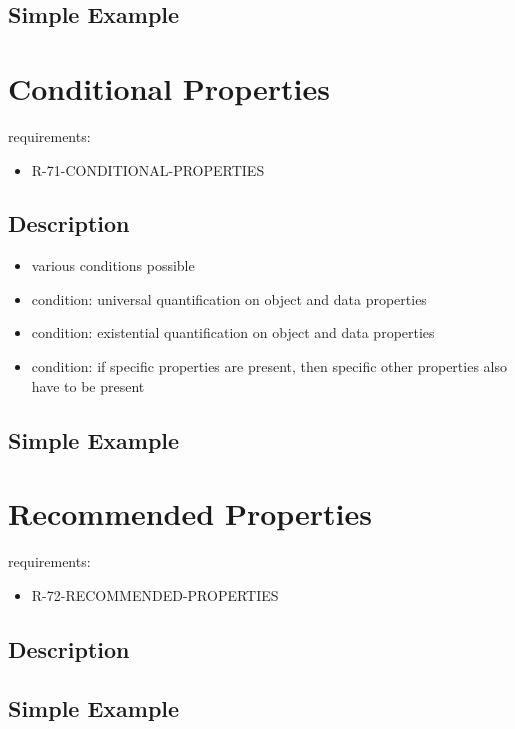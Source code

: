 \documentclass{llncs}
\begin{document}
\subsection{Simple Example}

\section{Conditional Properties}

requirements:

\begin{itemize}
	\item R-71-CONDITIONAL-PROPERTIES
\end{itemize}

\subsection{Description}

\begin{itemize}
	\item various conditions possible
  \item condition: universal quantification on object and data properties
  \item condition: existential quantification on object and data properties
  \item condition: if specific properties are present, then specific other properties also have to be present
\end{itemize}

\subsection{Simple Example}

\section{Recommended Properties}

requirements:

\begin{itemize}
	\item R-72-RECOMMENDED-PROPERTIES
\end{itemize}

\subsection{Description}

\subsection{Simple Example}
\end{document}
